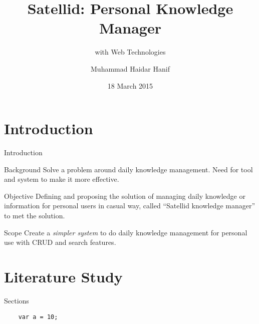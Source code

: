 \documentclass[10pt, compress]{beamer}
\title{Satellid: Personal Knowledge Manager}
\subtitle{with Web Technologies}
\date{18 March 2015}
\author{Muhammad Haidar Hanif}
\institute{Gunadarma University}
\begin{document}

\maketitle


\section{Introduction}


\begin{frame}{Introduction}

  \begin{block}{Background}
    Solve a problem around daily knowledge management.
  Need for tool and system to make it more effective.
  \end{block}

  \begin{block}{Objective}
    Defining and proposing the solution of managing daily knowledge or information for personal users in casual way, called ``Satellid knowledge manager'' to met the solution.
  \end{block}

  \begin{block}{Scope}
    Create a \emph{simpler system} to do daily knowledge management for personal use with \textsc{CRUD} and search features.
  \end{block}

\end{frame}


\section{Literature Study}


\begin{frame}{Sections}

  \begin{verbatim}
    var a = 10;
  \end{verbatim}

\end{frame}
\end{document}
